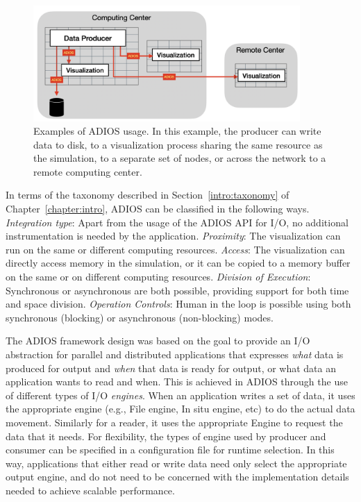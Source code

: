 \documentclass[x11names,table,xcdraw,graybox]{svmult}
\begin{document}
\begin{figure}[htb]
    \centering
    \includegraphics[width=4in]{figures/ADIOS}
    \caption{Examples of ADIOS usage. In this example, the producer can write data to disk, to a visualization process sharing the same resource as the simulation, to a separate set of nodes, or across the network to a remote computing center.}
    \label{ch10:fig:adios_design}
\end{figure}


In terms of the taxonomy described in Section~\ref{intro:taxonomy} of Chapter~\ref{chapter:intro}, ADIOS can be classified in the following ways. \emph{Integration type}: Apart from the usage of the ADIOS API for I/O, no additional instrumentation is needed by the application. \emph{Proximity}: The visualization can run on the same or different computing resources. \emph{Access}: The visualization can directly access memory in the simulation, or it can be copied to a memory buffer on the same or on different computing resources. \emph{Division of Execution}: Synchronous or asynchronous are both possible, providing support for both time and space division.  \emph{Operation Controls}: Human in the loop is possible using both synchronous (blocking) or asynchronous (non-blocking) modes.


The ADIOS framework design was based on the goal to provide an I/O abstraction for parallel and distributed applications that expresses \emph{what} data is produced for output and \emph{when} that data is ready for output, or what data an application wants to read and when\cite{liu2014hello, Logan2020, osti_1468120}.
This is achieved in ADIOS through the use of different types of I/O \emph{engines}. When an application writes a set of data, it uses the appropriate engine (e.g., File engine, In situ engine, etc) to do the actual data movement. Similarly for a reader, it uses the appropriate Engine to request the data that it needs. For flexibility, the types of engine used by producer and consumer can be specified in a configuration file for runtime selection.
In this way, applications that either read or write data need only select the appropriate output engine, and do not need to be concerned with the implementation details needed to achieve scalable performance.
\end{document}
